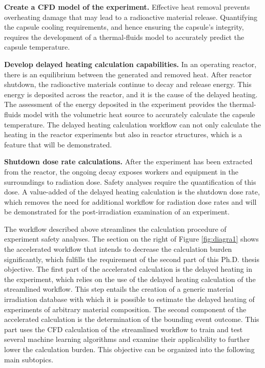 \textbf{Create a CFD model of the experiment.}
Effective heat removal prevents overheating damage that may lead to a radioactive material release.
Quantifying the capsule cooling requirements, and hence ensuring the capsule's integrity, requires the development of a thermal-fluids model to accurately predict the capsule temperature.

\textbf{Develop delayed heating calculation capabilities.}
In an operating reactor, there is an equilibrium between the generated and removed heat.
After reactor shutdown, the radioactive materials continue to decay and release energy.
This energy is deposited across the reactor, and it is the cause of the delayed heating.
The assessment of the energy deposited in the experiment provides the thermal-fluids model with the volumetric heat source to accurately calculate the capsule temperature.
The delayed heating calculation workflow can not only calculate the heating in the reactor experiments but also in reactor structures, which is a feature that will be demonstrated.

\textbf{Shutdown dose rate calculations.}
After the experiment has been extracted from the reactor, the ongoing decay exposes workers and equipment in the surroundings to radiation dose.
Safety analyses require the quantification of this dose.
A value-added of the delayed heating calculation is the shutdown dose rate, which removes the need for additional workflow for radiation dose rates and will be demonstrated for the post-irradiation examination of an experiment.

The workflow described above streamlines the calculation procedure of experiment safety analyses.
The section on the right of Figure \ref{fig:diagra1} shows the accelerated workflow that intends to decrease the calculation burden significantly, which fulfills the requirement of the second part of this Ph.D. thesis objective.
The first part of the accelerated calculation is the delayed heating in the experiment, which relies on the use of the delayed heating calculation of the streamlined workflow.
This step entails the creation of a generic material irradiation database with which it is possible to estimate the delayed heating of experiments of arbitrary material composition.
The second component of the accelerated calculation is the determination of the bounding event outcome.
This part uses the CFD calculation of the streamlined workflow to train and test several machine learning algorithms and examine their applicability to further lower the calculation burden.
This objective can be organized into the following main subtopics.

